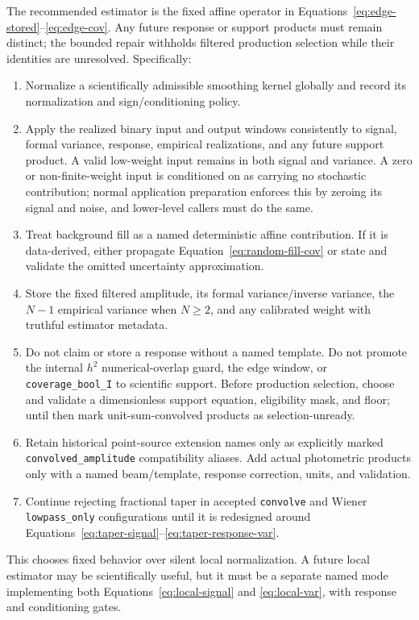 \documentclass[11pt]{article}
\newcommand{\code}[1]{\nolinkurl{#1}}
\begin{document}
The recommended estimator is the fixed affine operator in
Equations~\eqref{eq:edge-stored}--\eqref{eq:edge-cov}.  Any future response or
support products must remain distinct; the bounded repair withholds filtered
production selection while their identities are unresolved.  Specifically:
\begin{enumerate}
\item Normalize a scientifically admissible smoothing kernel globally and
record its normalization and sign/conditioning policy.
\item Apply the realized binary input and output windows consistently to
signal, formal variance, response, empirical realizations, and any future
support product.  A valid low-weight input remains in both signal and
variance.  A zero or non-finite-weight input is conditioned on as carrying no
stochastic contribution; normal application preparation enforces this by
zeroing its signal and noise, and lower-level callers must do the same.
\item Treat background fill as a named deterministic affine contribution.  If
it is data-derived, either propagate Equation~\eqref{eq:random-fill-cov} or
state and validate the omitted uncertainty approximation.
\item Store the fixed filtered amplitude, its formal variance/inverse variance,
the $N-1$ empirical variance when $N\ge2$, and any calibrated weight with
truthful estimator metadata.
\item Do not claim or store a response without a named template.  Do not
promote the internal $h^2$ numerical-overlap guard, the edge window, or
\code{coverage_bool_I} to scientific support.  Before production selection,
choose and validate a dimensionless support equation, eligibility mask, and
floor; until then mark unit-sum-convolved products as selection-unready.
\item Retain historical point-source extension names only as explicitly marked
\code{convolved_amplitude} compatibility aliases.  Add actual photometric
products only with a named beam/template, response correction, units, and
validation.
\item Continue rejecting fractional taper in accepted \code{convolve} and
Wiener \code{lowpass_only} configurations until it is redesigned around
Equations~\eqref{eq:taper-signal}--\eqref{eq:taper-response-var}.
\end{enumerate}

This chooses fixed behavior over silent local normalization.  A future local
estimator may be scientifically useful, but it must be a separate named mode
implementing both Equations~\eqref{eq:local-signal} and
\eqref{eq:local-var}, with response and conditioning gates.
\end{document}
